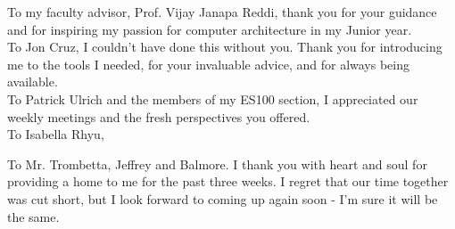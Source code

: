 

To my faculty advisor, Prof. Vijay Janapa Reddi, thank you for your guidance and for inspiring my passion for computer architecture in my Junior year. \\

To Jon Cruz, I couldn't have done this without you. Thank you for introducing me to the tools I needed, for your invaluable advice, and for always being available.  \\

To Patrick Ulrich and the members of my ES100 section, I appreciated our weekly meetings and the fresh perspectives you offered.\\

To Isabella Rhyu,  

To Mr. Trombetta, Jeffrey and Balmore. I thank you with heart and soul for providing a home to me for the past three weeks. I regret that our time together was cut short, but I look forward to coming up again soon - I'm sure it will be the same.   \\